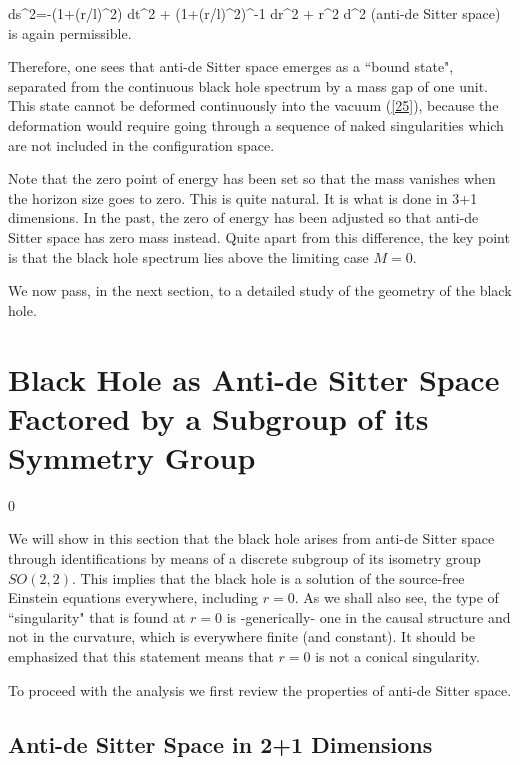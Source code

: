 \bb
 ds^2=-(1+(r/l)^2) dt^2 + (1+(r/l)^2)^{-1} dr^2 + r^2 d\phi^2
\label{26}
\ee
%
(anti-de Sitter space) is again permissible.

Therefore, one sees that anti-de Sitter space emerges as a ``bound state",
separated from the continuous black hole spectrum by a mass gap of one
unit. This state cannot be deformed continuously into the vacuum
(\ref{25}), because the deformation would require going through a sequence
of naked singularities which are not included in the configuration space.

Note that the zero point of energy has been set so that the mass vanishes
when the horizon size goes to zero. This is quite natural. It is what is
done in 3+1 dimensions. In the past, the zero of energy has been adjusted
so that anti-de Sitter space has zero mass instead. Quite apart from
this difference, the key point is that the black hole spectrum lies above
the limiting case $M=0$.

We now pass, in the next section, to a detailed study of the
geometry of the black hole.




\section{Black Hole as Anti-de Sitter Space Factored by a
Subgroup of its Symmetry Group}
\setcounter{equation} 0

We will show in this section that the black hole arises from
anti-de Sitter space through identifications by means of a
discrete subgroup of its isometry group $SO(2,2)$. This implies
that the black hole is a solution of the source-free Einstein
equations everywhere, including $r=0$. As we shall also see, the
type of ``singularity" that is found at $r=0$ is -generically-
one in the causal structure and not in the curvature, which is
everywhere finite (and constant).  It should be emphasized that
this statement means that $r = 0$ is not
a conical singularity.

To proceed with the analysis we first review the properties of
anti-de Sitter space.

\subsection{Anti-de Sitter Space in 2+1 Dimensions}

